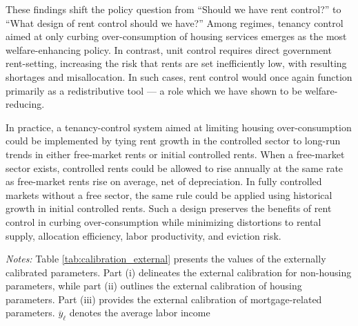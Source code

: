 \documentclass[parskip=full]{article}
\newenvironment{fignote2}[1]
{
\par
\medskip
\begin{minipage}{#1}
\footnotesize
}
{
\end{minipage}
}
\begin{document}
These findings shift the policy question from “Should we have rent control?” to “What design of rent control should we have?” Among regimes, tenancy control aimed at only curbing over-consumption of housing services emerges as the most welfare-enhancing policy. In contrast, unit control requires direct government rent-setting, increasing the risk that rents are set inefficiently low, with resulting shortages and misallocation. In such cases, rent control would once again function primarily as a redistributive tool — a role which we have shown to be welfare-reducing.

In practice, a tenancy-control system aimed at limiting housing over-consumption could be implemented by tying rent growth in the controlled sector to long-run trends in either free-market rents or initial controlled rents. When a free-market sector exists, controlled rents could be allowed to rise annually at the same rate as free-market rents rise on average, net of depreciation. In fully controlled markets without a free sector, the same rule could be applied using historical growth in initial controlled rents. Such a design preserves the benefits of rent control in curbing over-consumption while minimizing distortions to rental supply, allocation efficiency, labor productivity, and eviction risk.




\vspace{1cm}

\begin{table}[H]
    \centering
    \caption{Externally assigned parameter values}
    \vspace{-0.5cm}
    \label{tab:calibration_external}
    
    \vspace{-0.45cm}
    \begin{fignote2}{1.02\textwidth}
    \textit{Notes:} Table \ref{tab:calibration_external} presents the values of the externally calibrated parameters. Part (i) delineates the external calibration for non-housing parameters, while part (ii) outlines the external calibration of housing parameters. Part (iii) provides the external calibration of mortgage-related parameters. $\overline{y}_{\ell}$ denotes the average labor income
    \end{fignote2}
\end{table}
\end{document}
